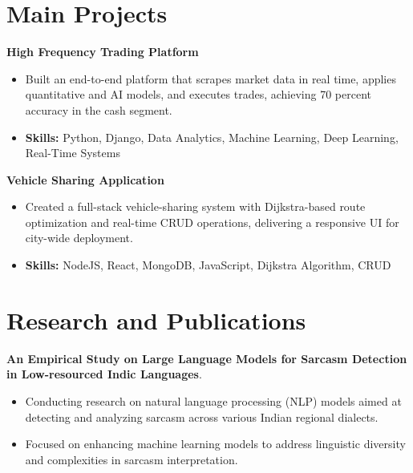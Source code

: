 \documentclass[a4paper,11pt]{article}
\begin{document}
\section{\textbf{Main Projects}}

\vspace{1mm}
  \textbf{High Frequency Trading Platform  }
\vspace{-1.5mm} %
\begin{itemize}
  \item Built an end-to-end platform that scrapes market data in real time, applies quantitative and AI models, and executes trades, achieving 70 percent accuracy in the cash segment.
\vspace{-3mm}
  \item \textbf{Skills:} Python, Django, Data Analytics, Machine Learning, Deep Learning, Real-Time Systems
\end{itemize}


\vspace{1mm}
   \textbf{Vehicle Sharing Application }
\vspace{-1.5mm} %
\begin{itemize}
  \item Created a full-stack vehicle-sharing system with Dijkstra-based route optimization and real-time CRUD operations, delivering a responsive UI for city-wide deployment.
\vspace{-3mm}
  \item \textbf{Skills:} NodeJS, React, MongoDB, JavaScript, Dijkstra Algorithm, CRUD
\end{itemize}



\section{\textbf{Research and Publications} \hfill }
\vspace{1mm}
  \textbf{An Empirical Study on Large Language Models for Sarcasm Detection in Low-resourced Indic Languages}.
\vspace{-1mm} %
\begin{itemize}
  \item Conducting research on natural language processing (NLP) models aimed at detecting and analyzing sarcasm across various Indian regional dialects.
\vspace{-3mm}
  \item Focused on enhancing machine learning models to address linguistic diversity and complexities in sarcasm interpretation.
\end{itemize}
\end{document}

